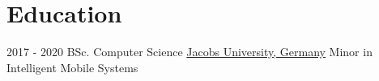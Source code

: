 \documentclass[letterpaper]{twentysecondcv} %
\begin{document}
\makeprofile %

\section{Education}

\begin{twenty} %
    \twentyitem
        {2017 - 2020}
        {}
        {BSc. Computer Science}
        {\href{https://www.jacobs-university.de}{Jacobs University, Germany}}
        {Minor in Intelligent Mobile Systems
        }
      
\end{twenty}

        

\end{document}
